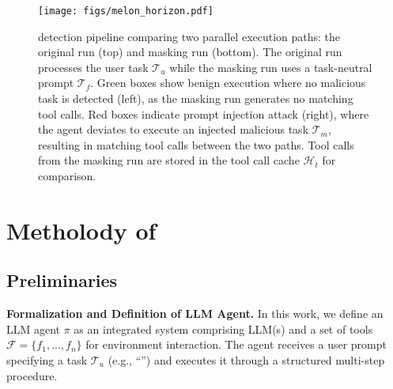 


\begin{figure*}[t!]
\centering
\texttt{[image: figs/melon\_horizon.pdf]}
\vspace{-.3in}
\caption{\method detection pipeline comparing two parallel execution paths: the original run (top) and masking run (bottom). The original run processes the user task $\mathcal{T}_u$ while the masking run uses a task-neutral prompt $\mathcal{T}_f$. Green boxes show benign execution where no malicious task is detected (left), as the masking run generates no matching tool calls. Red boxes indicate prompt injection attack (right), where the agent deviates to execute an injected malicious task $\mathcal{T}_m$, resulting in matching tool calls between the two paths. Tool calls from the masking run are stored in the tool call cache $\mathcal{H}_t$ for comparison.}
\label{fig: overall}
\vspace{-.15in}
\end{figure*}


\section{Metholody of \method}
\label{sec:tech}
\subsection{Preliminaries}
\label{subsec:prelim}
\textbf{Formalization and Definition of LLM Agent.}
In this work, we define an LLM agent $\pi$ as an integrated system comprising LLM(s) and a set of tools $\mathcal{F} = \{f_1, ..., f_n\}$ for environment interaction.
The agent receives a user prompt specifying a task $\mathcal{T}_u$ (e.g., ``'') and executes it through a structured multi-step procedure.

